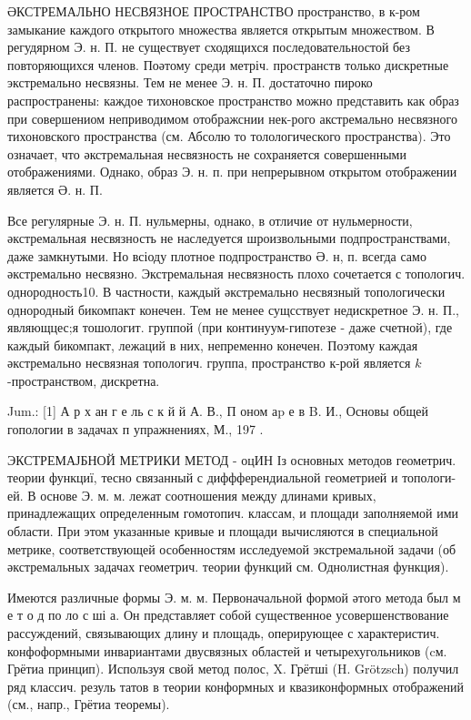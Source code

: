 \documentclass[10pt]{article}
\begin{document}
ӘКСТРЕМАЛЬНО НЕСВЯЗНОЕ ПРОСТРАНСТВО пространство, в к-ром замыкание каждого открытого множества является открытым множеством. В регудярном Э. н. П. не существует сходящихся последовательностой без повторяющихся членов. Поәтому среди метріч. пространств только дискретные экстремально несвязны. Тем не менее Э. н. П. достаточно пироко распространены: каждое тихоновское пространство можно представить как образ при совершениом неприводимом отображснии нек-рого акстремально несвязного тихоновского пространства (см. Абсолю то толологического пространства). Это означает, что әкстремальная несвязность не сохраняется совершенными отображениями. Однако, образ Э. н. п. при непрерывном открытом отображении является Ә. н. П.



Все регулярные Э. н. П. нульмерны, однако, в отличие от нульмерности, әкстремальная несвязность не наследуется шроизвольными подпространствами, даже замкнутыми. Но всіоду плотное подпространство Ә. н, п. всегда само әкстремально несвязно. Экстремальная несвязность плохо сочетается с топологич. однородность10. В частности, каждый әкстремально несвязный топологически однородный бикомпакт конечен. Тем не менее сущсствует недискретное Э. н. П., являющцес;я тошологит. группой (при континуум-гипотезе - даже счетной), где каждый бикомпакт, лежаций в них, непременно конечен. Поэтому каждая әкстремально несвязная топологич. группа, пространство к-рой является $k$-пространством, дискретна.



Jum.: [1] А р х ан г е ль с к й й А. В., П оном а$\mathrm{p}$ е в B. И., Основы общей гопологии в задачах п упражнениях, М., 197 .



ЭКСТРЕМАЈБНОЙ МЕТРИКИ МЕТОД - оцИН Із основных методов геометрич. теории функциї, тесно связанный с диффферендиальной геометрией и топологи- ей. В основе Э. м. м. лежат соотношения между длинами кривых, принадлежащих определенным гомотопич. классам, и площади заполняемой ими области. При этом указанные кривые и площади вычисляются в специальной метрике, соответствующей особенностям исследуемой экстремальной задачи (об әкстремальных задачах геометрич. теории функций см. Однолистная функция).



Имеются различные формы Э. м. м. Первоначальной формой әтого метода был м е т о д по ло с ші а. Он представляет собой существенное усовершенствование рассуждений, связывающих длину и площадь, оперирующее с характеристич. конфоформными инвариантами двусвязных областей и четырехугольников (cм. Грётиа принцип). Используя свой метод полос, X. Грётші (H. Grötzsch) получил ряд классич. резуль татов в теории конформных и квазиконформных отображений (см., напр., Грётиа теоремы).
\end{document}
